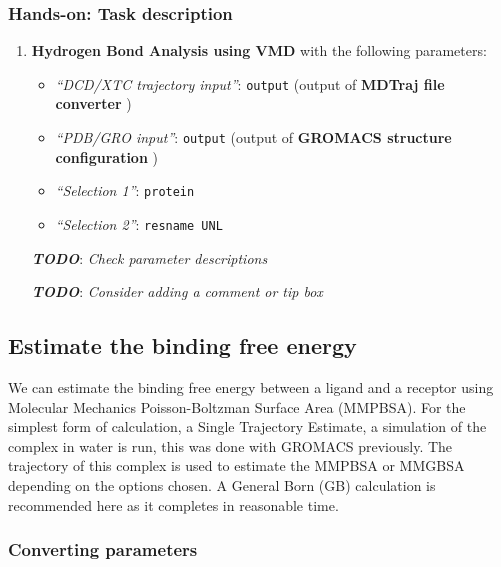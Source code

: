 \documentclass[twocolumn]{bmcart}%
\providecommand{\tightlist}{%
  \setlength{\itemsep}{0pt}\setlength{\parskip}{0pt}}
\providecommand{\tightlist}{%
  \setlength{\itemsep}{0pt}\setlength{\parskip}{0pt}}
\begin{document}
\begin{handson_box_colour}
\hypertarget{hands-on-task-description-16}{%
\subsubsection{Hands-on: Task
description}\label{hands-on-task-description-16}}

\begin{enumerate}
\def\labelenumi{\arabic{enumi}.}
\tightlist
\item
  \textbf{Hydrogen Bond Analysis using VMD} with the following
  parameters:

  \begin{itemize}
  \tightlist
  \item
    \emph{``DCD/XTC trajectory input''}: \texttt{output} (output of
    \textbf{MDTraj file converter} )
  \item
    \emph{``PDB/GRO input''}: \texttt{output} (output of \textbf{GROMACS
    structure configuration} )
  \item
    \emph{``Selection 1''}: \texttt{protein}
  \item
    \emph{``Selection 2''}: \texttt{resname\ UNL}
  \end{itemize}

  \textbf{\emph{TODO}}: \emph{Check parameter descriptions}

  \textbf{\emph{TODO}}: \emph{Consider adding a comment or tip box}
\end{enumerate}


\end{handson_box_colour}


\hypertarget{optional-estimate-the-binding-free-energy}{%
\subsection*{Estimate the binding free
energy}\label{optional-estimate-the-binding-free-energy}}

We can estimate the binding free energy between a ligand and a receptor
using Molecular Mechanics Poisson-Boltzman Surface Area (MMPBSA). For
the simplest form of calculation, a Single Trajectory Estimate, a
simulation of the complex in water is run, this was done with GROMACS
previously. The trajectory of this complex is used to estimate the
MMPBSA or MMGBSA depending on the options chosen. A General Born (GB)
calculation is recommended here as it completes in reasonable time.

\hypertarget{converting-parameters}{%
\subsubsection{Converting parameters}\label{converting-parameters}}
\end{document}
